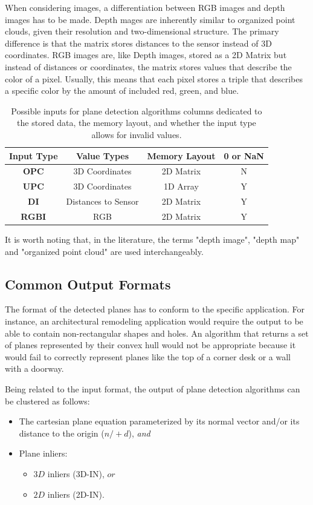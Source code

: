 \documentclass[main.tex]{subfiles}
\begin{document}
When considering images, a differentiation between RGB images and depth images has to be made.
Depth mages are inherently similar to organized point clouds, given their resolution and two-dimensional structure.
The primary difference is that the matrix stores distances to the sensor instead of 3D coordinates.
RGB images are, like Depth images, stored as a 2D Matrix but instead of distances or coordinates, the matrix stores
values that describe the color of a pixel. Usually, this means that each pixel stores a triple that describes a specific
color by the amount of included red, green, and blue.

\begin{table}[H]
    \centering
    \begin{tabular}{c|c|c|c}
        \textbf{Input Type} & \textbf{Value Types} & \textbf{Memory Layout} & \textbf{0 or NaN} \\ \hline
        \textbf{OPC}        & 3D Coordinates       & 2D Matrix              & N                 \\
        \textbf{UPC}        & 3D Coordinates       & 1D Array               & Y                 \\
        \textbf{DI}         & Distances to Sensor  & 2D Matrix              & Y                 \\
        \textbf{RGBI}       & RGB                  & 2D Matrix              & Y
    \end{tabular}
    \caption{Possible inputs for plane detection algorithms columns dedicated to the stored data, the memory layout, and whether
        the input type allows for invalid values.}
    \label{tab:inputs}
\end{table}
It is worth noting that, in the literature, the terms "depth image", "depth map" and "organized point cloud" are used interchangeably.

\subsection{Common Output Formats}
\label{subsec:output}
The format of the detected planes has to conform to the specific application. For instance, an architectural remodeling application
would require the output to be able to contain non-rectangular shapes and holes.
An algorithm that returns a set of planes represented by their convex hull would not be appropriate because it
would fail to correctly represent planes like the top of a corner desk or a wall with a doorway.

Being related to the input format, the output of plane detection algorithms can be clustered as follows:
\begin{itemize}
    \item The cartesian plane equation parameterized by its normal vector and/or its distance to the origin ($n/+d$), \textit{and}
    \item Plane inliers:
          \begin{itemize}
              \item $3D$ inliers (3D-IN), $or$
              \item $2D$ inliers (2D-IN).
          \end{itemize}
\end{itemize}
\end{document}
